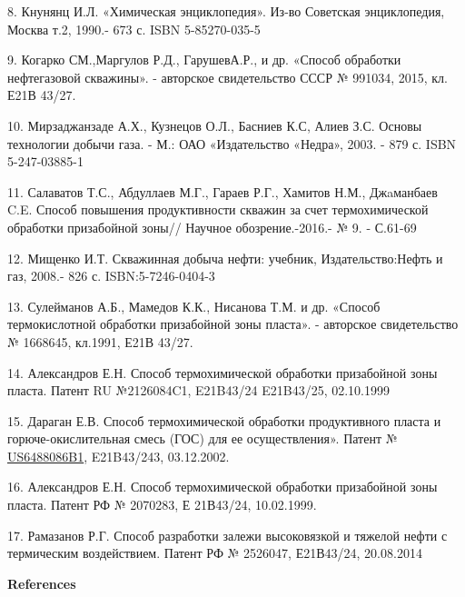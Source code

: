 \begin{refs}
8. Кнунянц И.Л. «Химическая энциклопедия». Из-во Советская энциклопедия,
Москва т.2, 1990.- 673 с. ISBN 5-85270-035-5

9. Когарко СМ.,Маргулов Р.Д., ГарушевА.Р., и др. «Способ обработки
нефтегазовой скважины». - авторское свидетельство СССР № 991034, 2015,
кл. Е21В 43/27.

10. Мирзаджанзаде А.Х., Кузнецов О.Л., Басниев К.С, Алиев З.С. Основы
технологии добычи газа. - М.: ОАО «Издательство «Недра», 2003. - 879 с.
ISBN 5-247-03885-1

11. Салаватов Т.С., Абдуллаев М.Г., Гараев Р.Г., Хамитов Н.М.,
Джaманбаев C.E. Способ повышения продуктивности скважин за счет
термохимической обработки призабойной зоны// Научное обозрение.-2016.- №
9. - С.61-69

12. Мищенко И.Т. Скважинная добыча нефти: учебник, Издательство:Нефть и
газ, 2008.- 826 с. ISBN:5-7246-0404-3

13. Сулейманов А.Б., Мамедов К.К., Нисанова Т.М. и др. «Способ
термокислотной обработки призабойной зоны пласта». - авторское
свидетельство № 1668645, кл.1991, Е21В 43/27.

14. Александров Е.Н. Способ термохимической обработки призабойной зоны
пласта. Патент RU №2126084C1, E21B43/24 E21B43/25, 02.10.1999

15. Дараган Е.В. Способ термохимической обработки продуктивного пласта и
горюче-окислитель\-ная смесь (ГОС) для ее осуществления». Патент №
\href{https://patents.google.com/patent/US6488086B1/en?peid=62a56b340c380\%3Ab7\%3A5c249fc3}{US6488086B1},
E21B43/243, 03.12.2002.

16. Александров Е.Н. Способ термохимической обработки призабойной зоны
пласта. Патент РФ № 2070283, Е 21В43/24, 10.02.1999.

17. Рамазанов Р.Г. Способ разработки залежи высоковязкой и тяжелой нефти
с термическим воздействием. Патент РФ № 2526047, Е21В43/24, 20.08.2014
\end{refs}

\begin{center}
{\bfseries References}
\end{center}

